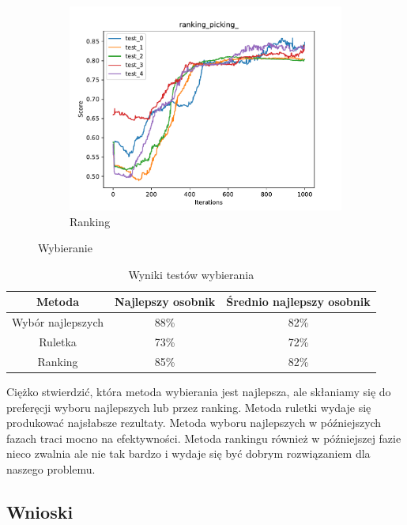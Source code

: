 \begin{figure}[H]
\begin{subfigure}[b]{0.49\linewidth}
        \includegraphics[width=\linewidth]{img/ranking_picking_.pdf}
        \caption{Ranking}
    \end{subfigure}
    \caption{Wybieranie}
    \label{fig:picking}
\end{figure}

\begin{table}[H]
    \centering
    \begin{tabular}{|c|c|c|}
    \hline
    Metoda       & Najlepszy osobnik & Średnio najlepszy osobnik \\ \hline
    Wybór najlepszych  & 88\%              & 82\%                      \\ \hline
    Ruletka      & 73\%              & 72\%                      \\ \hline
    Ranking      & 85\%              & 82\%                      \\ \hline
    \end{tabular}
    \caption{Wyniki testów wybierania}
    \label{tab:picking}
\end{table}
Ciężko stwierdzić, która metoda wybierania jest najlepsza, ale skłaniamy się do preferęcji wyboru najlepszych lub przez ranking. Metoda ruletki wydaje się produkować najsłabsze rezultaty. Metoda wyboru najlepszych w późniejszych fazach traci mocno na efektywności. Metoda rankingu również w późniejszej fazie nieco zwalnia ale nie tak bardzo i wydaje się być dobrym rozwiązaniem dla naszego problemu.
\subsection{Wnioski}